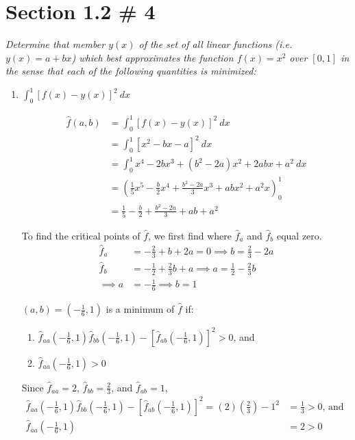 \documentclass[12pt]{article}
\begin{document}
\pagebreak
\section*{Section 1.2 \# 4}
{\it Determine that member $y(x)$ of the set of all linear functions (i.e. $y(x) = a + bx$) which best approximates the function $f(x) = x^2$ over $[0,1]$ in the sense that each of the following quantities is minimized:}

\begin{enumerate}[\ \ (a)\ \ ]

\item {\it $\int_0^1{[f(x) - y(x)]^2} \ dx$}
\begin{align*}
\hat{f}(a,b) &= \textstyle\int_0^1 [f(x) - y(x)]^2 \ dx \\
&= \textstyle\int_0^1 [x^2 - bx - a]^2 \ dx \\
&= \textstyle\int_0^1 x^4 - 2bx^3 + (b^2 - 2a)x^2 + 2abx + a^2 \ dx \\
&= \left(\tfrac{1}{5}x^5 -\tfrac{b}{2}x^4 + \tfrac{b^2 - 2a}{3}x^3 + abx^2 + a^2x\right)_0^1 \\
&= \tfrac{1}{5} - \tfrac{b}{2} + \tfrac{b^2 - 2a}{3} + ab + a^2
\end{align*}

To find the critical points of $\hat{f}$, we first find where $\hat{f}_{a}$ and $\hat{f}_{b}$ equal zero.
\begin{align*}
\hat{f}_{a} &= -\tfrac{2}{3} + b + 2a = 0 \implies b = \tfrac{2}{3} - 2a \\
\hat{f}_{b} &= -\tfrac{1}{2} + \tfrac{2}{3}b + a \implies a = \tfrac{1}{2} - \tfrac{2}{3}b \\ 
\implies a &= -\tfrac{1}{6} \implies b = 1
\end{align*}

$(a,b) = (-\frac{1}{6}, 1)$ is a minimum of $\hat{f}$ if:
\begin{enumerate}[\ \ (I)\ \ ]
\item $\hat{f}_{aa}(-\frac{1}{6}, 1)\hat{f}_{bb}(-\frac{1}{6}, 1) - \left[\hat{f}_{ab}(-\frac{1}{6}, 1)\right]^2 > 0$, and
\item $\hat{f}_{aa}(-\frac{1}{6}, 1) > 0$
\end{enumerate}

Since $\hat{f}_{aa} = 2$, $\hat{f}_{bb} = \tfrac{2}{3}$, and $\hat{f}_{ab} = 1$,
\begin{align*}
\hat{f}_{aa}(-\frac{1}{6}, 1)\hat{f}_{bb}(-\frac{1}{6}, 1) - \left[\hat{f}_{ab}(-\frac{1}{6}, 1)\right]^2 = (2)(\tfrac{2}{3}) - 1^2 &= \tfrac{1}{3} > 0 \text{, and } \\
\hat{f}_{aa}(-\tfrac{1}{6}, 1) &= 2 > 0
\end{align*}


\end{enumerate}
\end{document}
